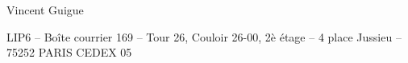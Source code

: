 \documentclass[11pt]{letter}
\begin{document}
 \vfill 

\hfill
\begin{minipage}{.3\textwidth}
Vincent Guigue
\end{minipage}

\vfill

\begin{center}

\tiny
LIP6 -- 
Boîte courrier 169 --
Tour 26, Couloir 26-00, 2è étage --
4 place Jussieu --
75252 PARIS CEDEX 05
\end{center}
\end{document}
